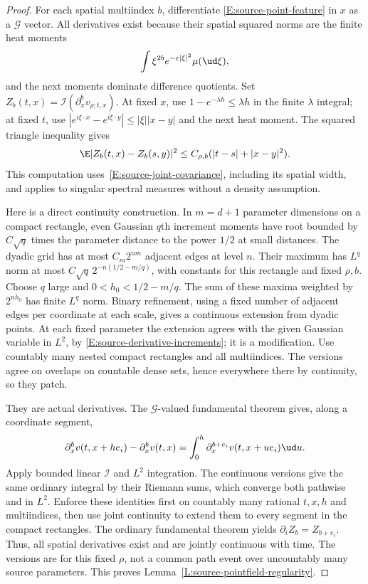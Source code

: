 \begin{proof}
  For each spatial multiindex $b$, differentiate
  \eqref{E:source-point-feature} in $x$ as a $\mathcal G$ vector.
  All derivatives exist because their spatial squared norms are the
  finite heat moments
  \[
    \int \xi^{2b}e^{-\varepsilon|\xi|^2}\mu(\ud\xi),
  \]
  and the next moments dominate difference quotients. Set
  $Z_b(t,x)=\mathcal I(\partial_x^bv_{\rho;t,x})$.
  At fixed $x$, use $1-e^{-\lambda h}\le\lambda h$ in the finite
  $\lambda$ integral; at fixed $t$, use
  $|e^{i\xi\cdot x}-e^{i\xi\cdot y}|\le|\xi||x-y|$ and the next heat
  moment. The squared triangle inequality gives
  \begin{equation}\label{E:source-derivative-increments}
    \E|Z_b(t,x)-Z_b(s,y)|^2
    \le C_{\rho,b}(|t-s|+|x-y|^2).
  \end{equation}
  This computation uses~\eqref{E:source-joint-covariance}, including its
  spatial width, and applies to singular spectral measures without a
  density assumption.

  Here is a direct continuity construction. In $m=d+1$ parameter
  dimensions on a compact rectangle, even Gaussian $q$th increment
  moments have root bounded by $C\sqrt q$ times the parameter distance
  to the power $1/2$ at small distances. The dyadic grid has at most
  $C_m2^{nm}$ adjacent edges at level $n$. Their maximum has $L^q$
  norm at most $C\sqrt q\,2^{-n(1/2-m/q)}$, with constants for this
  rectangle and fixed $\rho,b$. Choose $q$ large and
  $0<h_0<1/2-m/q$. The sum of these maxima weighted by $2^{nh_0}$
  has finite $L^q$ norm. Binary refinement, using a fixed number of
  adjacent edges per coordinate at each scale, gives a continuous
  extension from dyadic points. At each fixed parameter the extension
  agrees with the given Gaussian variable in $L^2$, by
  \eqref{E:source-derivative-increments}; it is a modification.
  Use countably many nested compact rectangles and all multiindices.
  The versions agree on overlaps on countable dense sets, hence
  everywhere there by continuity, so they patch.

  They are actual derivatives. The $\mathcal G$-valued fundamental
  theorem gives, along a coordinate segment,
  \[
    \partial_x^bv(t,x+he_i)-\partial_x^bv(t,x)
    =\int_0^h\partial_x^{b+e_i}v(t,x+ue_i)\ud u.
  \]
  Apply bounded linear $\mathcal I$ and $L^2$ integration. The continuous
  versions give the same ordinary integral by their Riemann sums, which
  converge both pathwise and in $L^2$. Enforce these identities first on
  countably many rational $t,x,h$ and multiindices, then use joint
  continuity to extend them to every segment in the compact rectangles.
  The ordinary fundamental theorem yields $\partial_iZ_b=Z_{b+e_i}$.
  Thus, all spatial derivatives exist and are jointly continuous with
  time. The versions are for this fixed $\rho$, not a common path event
  over uncountably many source parameters.
  This proves Lemma~\ref{L:source-pointfield-regularity}.
\end{proof}

